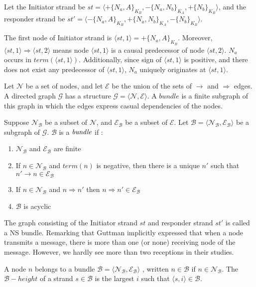 Let  the Initiator strand be $st = \langle +\{N_a,A\}_{K_B}, -\{N_a,N_b\}_{K_A},+\{N_b\}_{K_B} \rangle$, and the responder strand be $st' = \langle -\{N_a,A\}_{K_B}, +\{N_a,N_b\}_{K_A},-\{N_b\}_{K_B} \rangle$.

The first node of Initiator strand is $\langle st,1 \rangle = +\{N_a,A\}_{K_B}$. Moreover, $\langle st,1 \rangle \Rightarrow \langle st,2 \rangle$ means node $\langle st,1 \rangle$ is a causal predecessor of node $\langle st,2 \rangle$. $N_a$ occurs in $term(\langle st,1 \rangle)$. Additionally, since sign of $\langle st,1 \rangle$ is positive, and there does not exist any predecessor of $\langle st,1 \rangle$, $N_a$ uniquely originates at $\langle st,1 \rangle$.  
	
Let $\mathcal{N}$ be a set of nodes, and let $\mathcal{E}$ be the union of the sets of $\rightarrow$ and $\Rightarrow$ edges. A directed graph $\mathcal{G}$ has a structure $\mathcal{G} = \langle \mathcal{N},\mathcal{E}\rangle$. A $bundle$ is a finite subgraph of this graph in which the edges express casual dependencies of the nodes.

\begin{Definition} Suppose $\mathcal{N_B}$ be a subset of $\mathcal{N}$, and $\mathcal{E_B}$ be a subset of $\mathcal{E}$. Let $\mathcal{B} = \langle \mathcal{N_B},\mathcal{E_B}\rangle$ be a subgraph of $\mathcal{G}$. $\mathcal{B}$ is a $\emph{bundle}$ if :
\begin{enumerate}
\item $\mathcal{N_B}$ and $\mathcal{E_B}$ are finite
\item If $n \in \mathcal{N_B}$ and $term(n)$ is negative, then there is a unique $n'$ such that $ n' \rightarrow n \in \mathcal{E_B}$
\item If $n \in \mathcal{N_B}$ and $n \Rightarrow n'$ then $n \Rightarrow n' \in \mathcal{E_B}$ 
\item $\mathcal{B}$ is acyclic
\end{enumerate}
\end{Definition}

The graph consisting of the Initiator strand $st$ and responder strand $st'$ is called a NS bundle. Remarking that Guttman implicitly expressed that when a node transmits a message, there is more than one (or none) receiving node of the message. However, we hardly see more than two receptions in their studies. 

\begin{Definition}
A node $n$ belongs to a bundle $\mathcal{B} = \langle \mathcal{N_B},\mathcal{E_B}\rangle$ , written $n \in \mathcal{B}$ if $n \in \mathcal{N_B}$. The $\mathcal{B} -height$ of a strand $s \in \mathcal{B}$ is the largest $i$ such that $\langle s,i \rangle \in \mathcal{B}$. 
\end{Definition}

